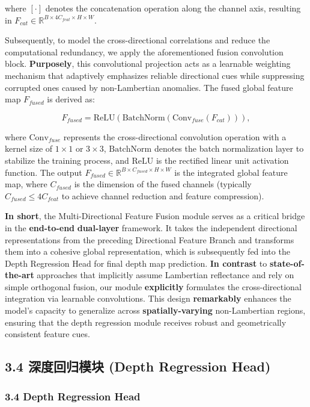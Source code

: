 \documentclass[journal]{IEEEtran}
\begin{document}
where $[\cdot]$ denotes the concatenation operation along the channel axis, resulting in $F_{cat} \in \mathbb{R}^{B \times 4C_{feat} \times H \times W}$.

Subsequently, to model the cross-directional correlations and reduce the computational redundancy, we apply the aforementioned fusion convolution block. \textbf{Purposely}, this convolutional projection acts as a learnable weighting mechanism that adaptively emphasizes reliable directional cues while suppressing corrupted ones caused by non-Lambertian anomalies. The fused global feature map $F_{fused}$ is derived as:

\[
F_{fused} = \text{ReLU}(\text{BatchNorm}(\text{Conv}_{fuse}(F_{cat}))), \tag{2}
\]

where $\text{Conv}_{fuse}$ represents the cross-directional convolution operation with a kernel size of $1 \times 1$ or $3 \times 3$, $\text{BatchNorm}$ denotes the batch normalization layer to stabilize the training process, and $\text{ReLU}$ is the rectified linear unit activation function. The output $F_{fused} \in \mathbb{R}^{B \times C_{fused} \times H \times W}$ is the integrated global feature map, where $C_{fused}$ is the dimension of the fused channels (typically $C_{fused} \le 4C_{feat}$ to achieve channel reduction and feature compression).

\textbf{In short}, the Multi-Directional Feature Fusion module serves as a critical bridge in the \textbf{end-to-end} \textbf{dual-layer} framework. It takes the independent directional representations from the preceding Directional Feature Branch and transforms them into a cohesive global representation, which is subsequently fed into the Depth Regression Head for final depth map prediction. \textbf{In contrast} to \textbf{state-of-the-art} approaches that implicitly assume Lambertian reflectance and rely on simple orthogonal fusion, our module \textbf{explicitly} formulates the cross-directional integration via learnable convolutions. This design \textbf{remarkably} enhances the model's capacity to generalize across \textbf{spatially-varying} non-Lambertian regions, ensuring that the depth regression module receives robust and geometrically consistent feature cues.

\subsection{3.4 深度回归模块 (Depth Regression Head)}

\subsubsection{3.4 Depth Regression Head}
\end{document}
